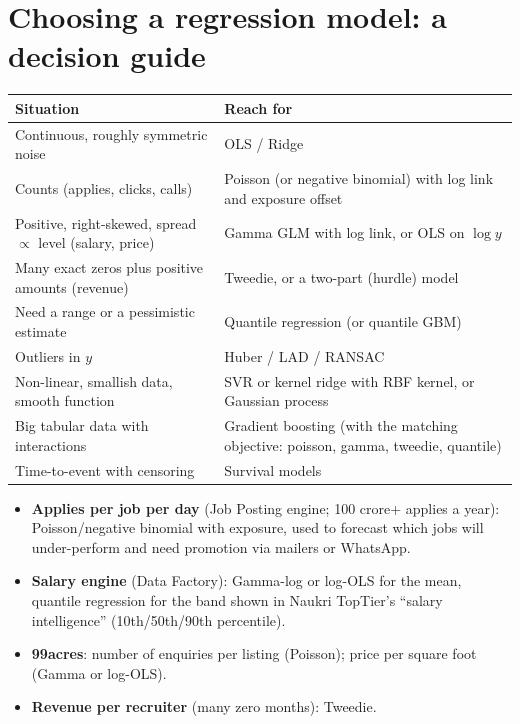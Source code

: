 \section{Choosing a regression model: a decision guide}
\begin{center}\small
\begin{tabularx}{\linewidth}{X X}
\toprule
Situation & Reach for\\
\midrule
Continuous, roughly symmetric noise & OLS / Ridge\\
Counts (applies, clicks, calls) & Poisson (or negative binomial) with log link and exposure offset\\
Positive, right-skewed, spread $\propto$ level (salary, price) & Gamma GLM with log link, or OLS on $\log y$\\
Many exact zeros plus positive amounts (revenue) & Tweedie, or a two-part (hurdle) model\\
Need a range or a pessimistic estimate & Quantile regression (or quantile GBM)\\
Outliers in $y$ & Huber / LAD / RANSAC\\
Non-linear, smallish data, smooth function & SVR or kernel ridge with RBF kernel, or Gaussian process\\
Big tabular data with interactions & Gradient boosting (with the matching objective: poisson, gamma, tweedie, quantile)\\
Time-to-event with censoring & Survival models\\
\bottomrule
\end{tabularx}
\end{center}

\begin{practical}
\begin{itemize}
\item \textbf{Applies per job per day} (Job Posting engine; 100 crore+ applies a year): Poisson/negative binomial with
  exposure, used to forecast which jobs will under-perform and need promotion via mailers or WhatsApp.
\item \textbf{Salary engine} (Data Factory): Gamma-log or log-OLS for the mean, quantile regression for the band shown in
  Naukri TopTier's ``salary intelligence'' (10th/50th/90th percentile).
\item \textbf{99acres}: number of enquiries per listing (Poisson); price per square foot (Gamma or log-OLS).
\item \textbf{Revenue per recruiter} (many zero months): Tweedie.
\end{itemize}
\end{practical}

